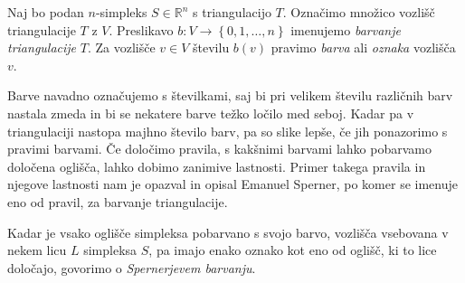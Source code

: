 \documentclass[mat1]{fmfdelo}
\newcommand{\R}{\mathbb R}
\newcommand{\0}{\underline{0}}
\begin{document}
\begin{definicija}
Naj bo podan $n$-simpleks $S \in \R^n$ s triangulacijo $T$. Označimo množico vozlišč triangulacije $T$ z $V$. Preslikavo $b : V \to \left \{0, 1, \dots, n \right \} $ imenujemo \emph{barvanje triangulacije} $T$. Za vozlišče $v \in V$ številu $b(v)$ pravimo \emph{barva} ali \emph{oznaka} vozlišča $v$.
\end{definicija}
Barve navadno označujemo s številkami, saj bi pri velikem številu različnih barv nastala zmeda in bi se nekatere barve težko ločilo med seboj. Kadar pa v triangulaciji nastopa majhno število barv, pa so slike lepše, če jih ponazorimo s pravimi barvami. Če določimo pravila, s kakšnimi barvami lahko pobarvamo določena oglišča, lahko dobimo zanimive lastnosti. Primer takega pravila in njegove lastnosti nam je opazval in opisal Emanuel Sperner, po komer se imenuje eno od pravil, za barvanje triangulacije.
\begin{definicija}
Kadar je vsako oglišče simpleksa pobarvano s svojo barvo, vozlišča vsebovana v nekem licu $L$ simpleksa $S$, pa imajo enako oznako kot eno od oglišč, ki to lice določajo, govorimo o \emph{Spernerjevem barvanju}.
\end{definicija}
\newcommand*\rows{6}
\newcommand*\vel{1.8}
\end{document}
